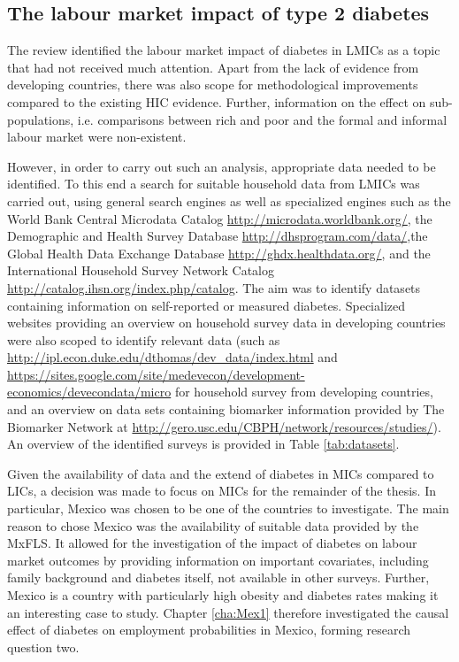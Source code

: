\subsection{The labour market impact of type 2 diabetes}

The review identified the labour market impact of diabetes in \acp{LMIC} as a topic that had not received much attention. Apart from the lack of evidence from developing countries, there was also scope for methodological improvements compared to the existing \ac{HIC} evidence. Further, information on the effect on sub-populations, i.e. comparisons between rich and poor and the formal and informal labour market were non-existent.

However, in order to carry out such an analysis, appropriate data needed to be identified. To this end a search for suitable household data from \acp{LMIC} was carried out, using general search engines as well as specialized engines such as the World Bank Central Microdata Catalog  \url{http://microdata.worldbank.org/}, the Demographic and Health Survey Database \url{http://dhsprogram.com/data/},the Global Health Data Exchange Database \url{http://ghdx.healthdata.org/}, and the International Household Survey Network Catalog \url{http://catalog.ihsn.org/index.php/catalog}. The aim was to identify datasets containing information on self-reported or measured diabetes. Specialized websites providing an overview on household survey data in developing countries were also scoped to identify relevant data (such as \url{http://ipl.econ.duke.edu/dthomas/dev_data/index.html} and \url{https://sites.google.com/site/medevecon/development-economics/devecondata/micro} for household survey from developing countries, and an overview on data sets containing biomarker information provided by The Biomarker Network at \url{http://gero.usc.edu/CBPH/network/resources/studies/}). An overview of the identified surveys is provided in Table \ref{tab:datasets}.

Given the availability of data and the extend of diabetes in \acp{MIC} compared to \acp{LIC}, a decision was made to focus on \acp{MIC} for the remainder of the thesis. In particular, Mexico was chosen to be one of the countries to investigate. The main reason to chose Mexico was the availability of suitable  data provided by the \ac{MxFLS}. It allowed for the investigation of the impact of diabetes on labour market outcomes by providing information on important covariates, including family background and diabetes itself, not available in other surveys. Further, Mexico is a country with particularly high obesity and diabetes rates making it an interesting case to study. Chapter \ref{cha:Mex1} therefore investigated the causal effect of diabetes on employment probabilities in Mexico, forming research question two.

